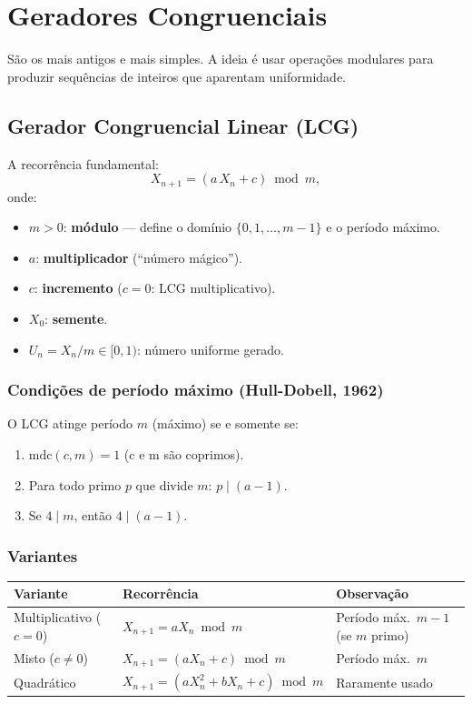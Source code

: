\documentclass[12pt,a4paper]{article}
\begin{document}
\section{Geradores Congruenciais}

S\~ao os mais antigos e mais simples. A ideia \'e usar opera\c{c}\~oes modulares para produzir sequ\^encias de inteiros que aparentam uniformidade.

\subsection{Gerador Congruencial Linear (LCG)}

A recorr\^encia fundamental:
\[
  X_{n+1} = (a\,X_n + c) \bmod m,
\]
onde:
\begin{itemize}
  \item $m > 0$: \textbf{m\'odulo} --- define o dom\'inio $\{0, 1, \ldots, m-1\}$ e o per\'iodo m\'aximo.
  \item $a$: \textbf{multiplicador} (``n\'umero m\'agico'').
  \item $c$: \textbf{incremento} ($c=0$: LCG multiplicativo).
  \item $X_0$: \textbf{semente}.
  \item $U_n = X_n / m \in [0,1)$: n\'umero uniforme gerado.
\end{itemize}

\subsubsection*{Condi\c{c}\~oes de per\'iodo m\'aximo (Hull-Dobell, 1962)}

O LCG atinge per\'iodo $m$ (m\'aximo) se e somente se:
\begin{enumerate}
  \item $\text{mdc}(c, m) = 1$ (c e m s\~ao coprimos).
  \item Para todo primo $p$ que divide $m$: $p \mid (a-1)$.
  \item Se $4 \mid m$, ent\~ao $4 \mid (a-1)$.
\end{enumerate}

\subsubsection*{Variantes}

\begin{center}
\begin{tabularx}{\textwidth}{@{}l l >{\raggedright\arraybackslash}X@{}}
\toprule
Variante & Recorr\^encia & Observa\c{c}\~ao \\
\midrule
Multiplicativo ($c=0$) & $X_{n+1} = aX_n \bmod m$ & Per\'iodo m\'ax.\ $m-1$ (se $m$ primo) \\
Misto ($c \neq 0$) & $X_{n+1} = (aX_n+c) \bmod m$ & Per\'iodo m\'ax.\ $m$ \\
Quadr\'atico & $X_{n+1} = (aX_n^2+bX_n+c) \bmod m$ & Raramente usado \\
\bottomrule
\end{tabularx}
\end{center}
\end{document}
